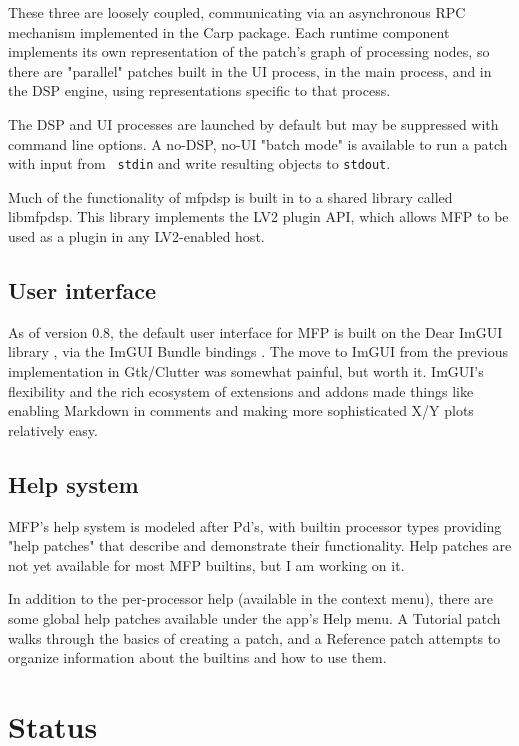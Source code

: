 \documentclass[a4paper]{article}
\def\:{\hskip0pt}
\begin{document}
These three are loosely coupled, communicating via an
asynchronous RPC mechanism implemented in the Carp
\cite{Gribble:Carp} package. Each runtime component implements
its own representation of the patch's graph of processing nodes,
so there are "parallel" patches built in the UI process, in the
main process, and in the DSP engine, using representations
specific to that process.

The DSP and UI processes are launched by default but may be
suppressed with command line options. A no\:-\:DSP, no\:-\:UI
"batch mode" is available to run a patch with input from {\tt
stdin} and write resulting objects to {\tt stdout}.

Much of the functionality of mfpdsp is built in to a shared
library called libmfpdsp. This library implements the LV2
plugin API, which allows MFP to be used as a plugin in any
LV2-enabled host.

\subsection{User interface}

As of version 0.8, the default user interface for MFP is built on
the Dear ImGUI library \cite{DearImGUI}, via the ImGUI Bundle
bindings \cite{ImguiBundle}. The move to ImGUI from the previous
implementation in Gtk/Clutter was somewhat painful, but worth it.
ImGUI's flexibility and the rich ecosystem of extensions and
addons made things like enabling Markdown in comments and making
more sophisticated X/Y plots relatively easy.

\subsection{Help system}

MFP's help system is modeled after Pd's, with builtin processor
types providing "help patches" that describe and demonstrate
their functionality. Help patches are not yet available for most
MFP builtins, but I am working on it.

In addition to the per-processor help (available in the context menu),
there are some global help patches available under the app's Help menu.
A Tutorial patch walks through the basics of creating a patch, and
a Reference patch attempts to organize information about the
builtins and how to use them.

\section{Status}
\end{document}

